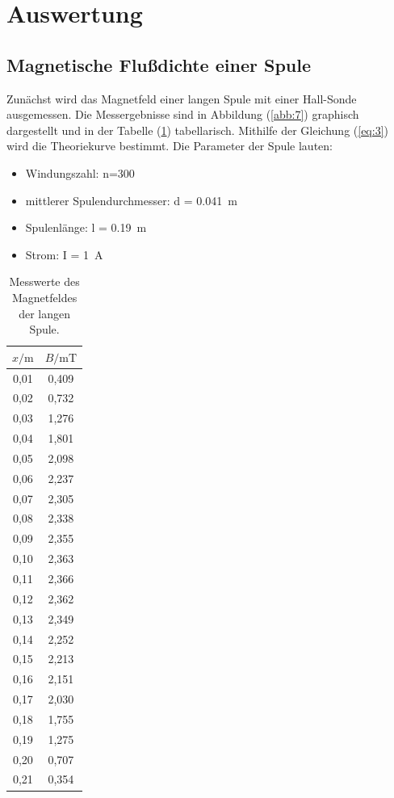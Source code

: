 \section{Auswertung}
\subsection{Magnetische Flußdichte einer Spule}

Zunächst wird das Magnetfeld einer langen Spule mit einer Hall-Sonde ausgemessen.
Die Messergebnisse sind in Abbildung (\ref{abb:7}) graphisch dargestellt und in der
Tabelle (\ref{tab:1}) tabellarisch. Mithilfe der Gleichung (\ref{eq:3}) wird die
Theoriekurve bestimmt. Die Parameter der Spule lauten:

\begin{itemize}
  \item Windungszahl: n=300
  \item mittlerer Spulendurchmesser: d = \SI{0.041}{\meter}
  \item Spulenlänge: l = \SI{0.19}{\meter}
  \item Strom: I = \SI{1}{\ampere}
\end{itemize}

\begin{table}[H]
  \centering
  \caption{Messwerte des Magnetfeldes der langen Spule.}
  \label{tab:1}
  \begin{tabular}{c c}
    \toprule
    $x/\si{\meter}$ & $B/\si{\milli\tesla}$ \\
    \midrule
    0,01 & 0,409 \\
    0,02 & 0,732 \\
    0,03 & 1,276 \\
    0,04 & 1,801 \\
    0,05 & 2,098 \\
    0,06 & 2,237 \\
    0,07 & 2,305 \\
    0,08 & 2,338 \\
    0,09 & 2,355 \\
    0,10 & 2,363 \\
    0,11 & 2,366 \\
    0,12 & 2,362 \\
    0,13 & 2,349 \\
    0,14 & 2,252 \\
    0,15 & 2,213 \\
    0,16 & 2,151 \\
    0,17 & 2,030 \\
    0,18 & 1,755 \\
    0,19 & 1,275 \\
    0,20 & 0,707 \\
    0,21 & 0,354 \\
    \bottomrule
  \end{tabular}
\end{table}

